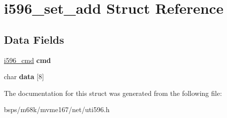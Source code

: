 \hypertarget{structi596__set__add}{}\section{i596\+\_\+set\+\_\+add Struct Reference}
\label{structi596__set__add}
\subsection*{Data Fields}
\begin{DoxyCompactItemize}
\item 
\mbox{\label{structi596__set__add_a2a375ac0906cea021653fb3f3c4fa424}} 
\mbox{\hyperlink{structi596__cmd}{i596\+\_\+cmd}} {\bfseries cmd}
\item 
\mbox{\label{structi596__set__add_a1f0eea7e4bf88346b6ba81abbe211e8b}} 
char {\bfseries data} \mbox{[}8\mbox{]}
\end{DoxyCompactItemize}


The documentation for this struct was generated from the following file\+:\begin{DoxyCompactItemize}
\item 
bsps/m68k/mvme167/net/uti596.\+h\end{DoxyCompactItemize}
